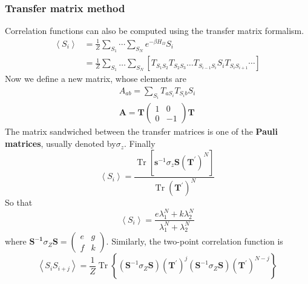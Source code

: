 \documentclass[12pt,titlepage]{article}
\numberwithin{equation}{section}
\begin{document}
\subsubsection{Transfer matrix method}
Correlation functions can also be computed using the transfer matrix formalism.
\begin{equation}
\begin{aligned}\left\langle S_{i}\right\rangle &=\frac{1}{Z} \sum_{S_{1}} \cdots \sum_{S_{N}} e^{-\beta H_{\Omega}} S_{i} \\ &=\frac{1}{Z} \sum_{S_{1}} \ldots \sum_{S_{N}}\left[T_{S_{1} S_{2}} T_{S_{2} S_{3}} \ldots T_{S_{i-1} S_{i}} S_{i} T_{S_{i} S_{i+1}} \cdots\right] \end{aligned}
\end{equation}
Now we define a new matrix, whose elements are
\begin{equation}
\begin{array}{l}{A_{a b}=\sum_{S_{i}} T_{a S_{i}} T_{S_{i} b} S_{i}} \\ {\mathbf{A}=\mathbf{T}\left(\begin{array}{cc}{1} & {0} \\ {0} & {-1}\end{array}\right) \mathbf{T}}\end{array}
\end{equation}
The matrix sandwiched between the transfer matrices is one of the \textbf{Pauli matrices}, usually denoted by$\sigma_{z}$. Finally
\begin{equation}
\left\langle S_{i}\right\rangle=\frac{\operatorname{Tr}\left[\mathbf{s}^{-1} \sigma_{z} \mathbf{S}\left(\mathbf{T}^{\prime}\right)^{N}\right]}{\operatorname{Tr}\left(\mathbf{T}^{\prime}\right)^{N}}
\end{equation}
So that 
\begin{equation}
\left\langle S_{i}\right\rangle=\frac{e \lambda_{1}^{N}+k \lambda_{2}^{N}}{\lambda_{1}^{N}+\lambda_{2}^{N}}
\end{equation}
where $\mathbf{S}^{-\mathbf{1}} \sigma_{Z} \mathbf{S}=\left(\begin{array}{ll}{e} & {g} \\ {f} & {k}\end{array}\right)$. Similarly, the two-point correlation function is
\begin{equation}
\left\langle S_{i} S_{i+j}\right\rangle=\frac{1}{Z} \operatorname{Tr}\left\{\left(\mathbf{S}^{-1} \sigma_{Z} \mathbf{S}\right)\left(\mathbf{T}^{\prime}\right)^{j}\left(\mathbf{S}^{-1} \sigma_{Z} \mathbf{S}\right)\left(\mathbf{T}^{\prime}\right)^{N-j}\right\}
\end{equation}
\end{document}
